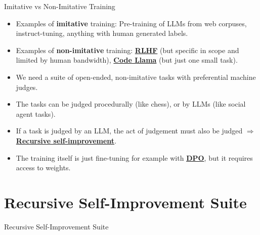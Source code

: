 \documentclass{beamer}
\begin{document}
\begin{frame}{Imitative vs Non-Imitative Training}
  \begin{itemize}
   \item Examples of \textbf{imitative} training: Pre-training of LLMs from web corpuses, instruct-tuning, anything with human generated labels.
   \item Examples of \textbf{non-imitative} training: \textcolor{blue}{\href{https://arxiv.org/abs/1909.08593}{\textbf{RLHF}}} (but specific in scope and limited by human bandwidth), \textcolor{blue}{\href{https://about.fb.com/news/2023/08/code-llama-ai-for-coding/}{\textbf{Code Llama}}} (but just one small task).
   \item We need a suite of open-ended, non-imitative tasks with preferential machine judges.
   \item The tasks can be judged procedurally (like chess), or by LLMs (like social agent tasks).
   \item If a task is judged by an LLM, the act of judgement must also be judged $\Rightarrow$ \textcolor{blue}{\href{https://github.com/keskival/recursive-self-improvement-suite}{\textbf{Recursive self-improvement}}}.
   \item The training itself is just fine-tuning for example with \textcolor{blue}{\href{https://arxiv.org/abs/2305.18290}{\textbf{DPO}}}, but it requires access to weights.
  \end{itemize}

\end{frame}

\section{Recursive Self-Improvement Suite}
\begin{frame}{Recursive Self-Improvement Suite}
\end{frame}
\end{document}
